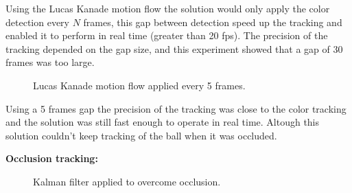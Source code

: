 \documentclass[10pt,twocolumn,letterpaper]{article}
\begin{document}
  Using the Lucas Kanade motion flow the solution would only apply the color
  detection every $N$ frames, this gap between detection speed up the tracking
  and enabled it to perform in real time (greater than 20 fps). The precision of
  the tracking depended on the gap size, and this experiment showed that a gap
  of 30 frames was too large.

  \begin{figure}[!h]
    \centering
    \setlength{\fboxsep}{1pt}
    \setlength{\fboxrule}{1pt}
    \caption{Lucas Kanade motion flow applied every 5 frames.}
    \label{fig:motion_5}
  \end{figure}

  Using a 5 frames gap the precision of the tracking was close to the color
  tracking and the solution was still fast enough to operate in real time.
  Altough this solution couldn't keep tracking of the ball when it was occluded.

  \bigbreak
  \textbf{Occlusion tracking:}
  \bigbreak

  \begin{figure}[!h]
    \centering
    \setlength{\fboxsep}{1pt}
    \setlength{\fboxrule}{1pt}
    \caption{Kalman filter applied to overcome occlusion.}
    \label{fig:occlusion}
  \end{figure}
\end{document}

